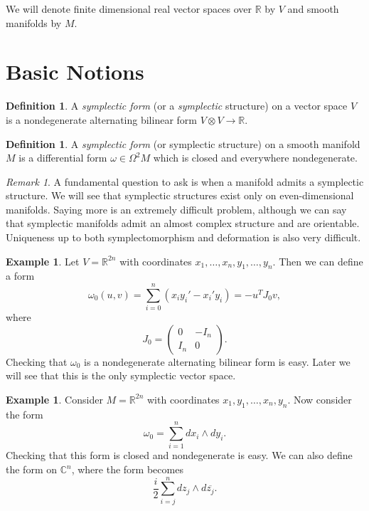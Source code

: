 \documentclass[leqno, openany]{memoir}
\theoremstyle{definition}
\newtheorem{defn}[thm]{Definition}
\newtheorem{exm}[thm]{Example}
\theoremstyle{remark}
\newtheorem{rmk}[thm]{Remark}
\theoremstyle{plain}
\theoremstyle{definition}
\theoremstyle{remark}
\newcommand{\R}{\mathbb{R}}
\newcommand{\C}{\mathbb{C}}
\begin{document}
We will denote finite dimensional real vector spaces over $\R$ by $V$ and smooth manifolds by $M$.

\section{Basic Notions}%
\label{sec:basic_notions}

\begin{defn}
    A \textit{symplectic form} (or a \textit{symplectic} structure) on a vector space $V$ is a nondegenerate alternating bilinear form $V \otimes V \to \R$.
\end{defn}

\begin{defn}
    A \textit{symplectic form} (or symplectic structure) on a smooth manifold $M$ is a differential form $\omega \in \Omega^2 M$ which is closed and everywhere nondegenerate.
\end{defn}

\begin{rmk}
A fundamental question to ask is when a manifold admits a symplectic structure. We will see that symplectic structures exist only on even-dimensional manifolds. Saying more is an extremely difficult problem, although we can say that symplectic manifolds admit an almost complex structure and are orientable. Uniqueness up to both symplectomorphism and deformation is also very difficult.
\end{rmk}

\begin{exm}
    Let $V = \R^{2n}$ with coordinates $x_1, \ldots, x_n, y_1, \ldots, y_n$. Then we can define a form
    \[ \omega_0(u,v) = \sum_{i=0}^n (x_i y_i' - x_i'y_i) = -u^T J_0 v, \]
    where 
    \[J_0 = \begin{pmatrix}
        0 & -I_n \\
        I_n & 0
    \end{pmatrix}.\]
    Checking that $\omega_0$ is a nondegenerate alternating bilinear form is easy. Later we will see that this is the only symplectic vector space.
\end{exm}

\begin{exm}
    Consider $M = \R^{2n}$ with coordinates $x_1, y_1, \ldots, x_n, y_n$. Now consider the form
    \[ \omega_0 = \sum_{i=1}^n dx_i \wedge dy_i.\] 
    Checking that this form is closed and nondegenerate is easy. We can also define the form on $\C^n$, where the form becomes 
    \[ \frac{i}{2} \sum_{i=j}^n dz_j \wedge d \overline{z_j}.\]
\end{exm}
\end{document}
